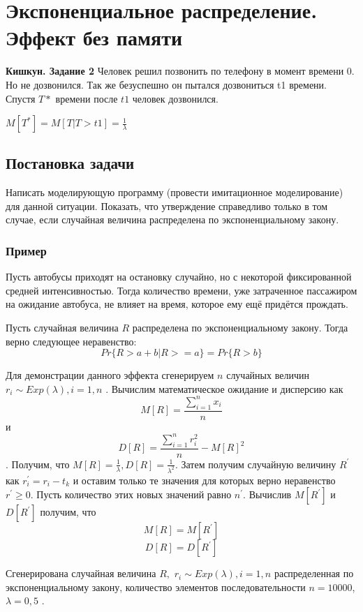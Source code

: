 \section{Экспоненциальное распределение. Эффект без памяти}
\textbf{Кишкун. Задание 2}
Человек решил позвонить по телефону в момент времени $ 0 $. Но не дозвонился.
Так же безуспешно он пытался дозвониться t1 времени. Спустя $ T{*} $ времени после $ t1 $ человек дозвонился. 

\begin{center}
	$M[T^{*}]=M[T\vert T>t1]=\frac{1}{\lambda}$
\end{center}

\subsection{Постановка задачи}
Написать моделирующую программу (провести имитационное моделирование)
для данной ситуации. Показать, что утверждение справедливо только
в том случае, если случайная величина распределена по экспоненциальному
закону. 

\subsubsection{Пример}
Пусть автобусы приходят на остановку случайно, но с некоторой фиксированной
средней интенсивностью. Тогда количество времени, уже затраченное
пассажиром на ожидание автобуса, не влияет на время, которое ему ещё
придётся прождать. 

Пусть случайная величина $ R $ распределена по экспоненциальному закону. Тогда верно следующее неравенство:
\[ P{r}\{R>a+b | R>=a\}=Pr\{R>b\} \]

Для демонстрации данного эффекта сгенерируем $n$ случайных величин
$r_{i}\sim Exp(\lambda),i=1,n$ . Вычислим математическое
ожидание и дисперсию как \[ M[R]=\frac{\sum_{i=1}^{n}x_{i}}{n} \]
и \[ D[R]=\frac{\sum_{i=1}^{n}r_{i}^{2}}{n}-M[R]^{2} \]. Получим, что $M[R]=\frac{1}{\lambda}, D[R]=\frac{1}{\lambda^{2}}$. Затем получим случайную величину $R^{'}$ как $r_{i}^{'}=r_{i}-t_{k}$ и оставим только те значения для которых верно неравенство $r^{'}\geq0$. Пусть количество этих новых значений равно $n^{'}$. Вычислив $M[R^{'}]$
и $D[R^{'}]$ получим, что \[ M[R]=M[R^{'}] \]
\[ D[R]=D[R^{'}] \]

Сгенерирована случайная величина $R,$ $r_{i}\sim Exp(\lambda),i=1,n$
распределенная по экспоненциальному закону, количество элементов последовательности
$n=10000$, $\lambda=0,5$ . 


